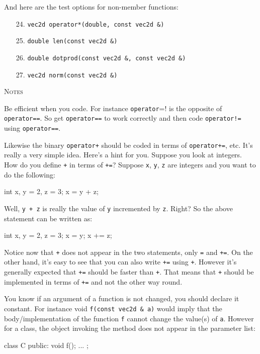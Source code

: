 And here are the test options for non-member functions:
\begin{itemize}
  \item[24.] \verb!vec2d operator*(double, const vec2d &)!
  \item[25.] \verb!double len(const vec2d &)!
  \item[26.] \verb!double dotprod(const vec2d &, const vec2d &)!
  \item[27.] \verb!vec2d norm(const vec2d &)!
\end{itemize}


\newpage
\textsc{Notes}

Be efficient when you code.
For instance \verb!operator!=! is the opposite of \verb!operator==!.
So get \verb!operator==! to work correctly and then code
\texttt{operator!=} using \verb!operator==!.

Likewise the binary
\verb!operator+! should be coded in terms of
\verb!operator+=!, etc.
It's really a very simple idea.
Here's a hint for you.
Suppose you look at integers.
How do you define \verb!+! in terms of \verb!+=!?
Suppose \verb!x!, \verb!y!, \verb!z! are integers and
you want to do the following:
{\small
\begin{console}
int x, y = 2, z = 3;
x = y + z;
\end{console}
}


Well, \verb!y + z! is really the value of \verb!y! incremented by \verb!z!.
Right? So the above statement can be written as:
{\small
\begin{console}
int x, y = 2, z = 3;
x = y;
x += z;
\end{console}
}

Notice now that \verb!+! does not appear in the two statements,
only \verb!=! and \verb!+=!.
On the other hand, it's easy to see that you can also write
\verb!+=! using \verb!+!.
However it's generally expected that \verb!+=! should be faster than
\verb!+!.
That means that \verb!+! should be implemented in terms of
\verb!+=! and not the other way round.

You know if an argument of a function is not changed,
you should declare it constant.
For instance void
\verb!f(const vec2d & a)! would imply that the body/implementation of the
function \verb!f! cannot change the value(s) of \verb!a!.
However for a class, the object invoking the method does not appear
in the parameter list:
{\small
\begin{console}
  class C
{
public:
    void f();
    ...
};
\end{console}
}

